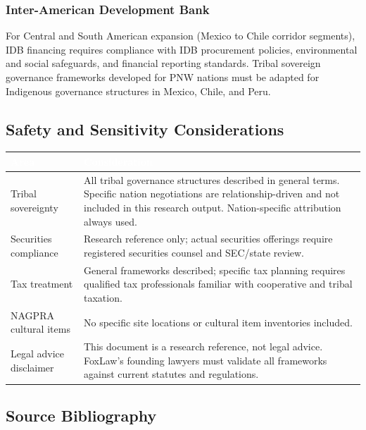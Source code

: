 \documentclass[11pt,letterpaper]{article}
\newcommand{\tableheader}[1]{\textbf{\sffamily\textcolor{white}{#1}}}
\begin{document}
\subsubsection{Inter-American Development Bank}

For Central and South American expansion (Mexico to Chile corridor segments), IDB financing requires compliance with IDB procurement policies, environmental and social safeguards, and financial reporting standards. Tribal sovereign governance frameworks developed for PNW nations must be adapted for Indigenous governance structures in Mexico, Chile, and Peru.

\subsection{Safety and Sensitivity Considerations}

\begin{center}
\begin{tabularx}{\textwidth}{L{4cm}X}
\toprule
{}
\tableheader{Area} & \tableheader{Consideration} \\
\midrule
Tribal sovereignty & All tribal governance structures described in general terms. Specific nation negotiations are relationship-driven and not included in this research output. Nation-specific attribution always used. \\
Securities compliance & Research reference only; actual securities offerings require registered securities counsel and SEC/state review. \\
Tax treatment & General frameworks described; specific tax planning requires qualified tax professionals familiar with cooperative and tribal taxation. \\
NAGPRA cultural items & No specific site locations or cultural item inventories included. \\
Legal advice disclaimer & This document is a research reference, not legal advice. FoxLaw's founding lawyers must validate all frameworks against current statutes and regulations. \\
\bottomrule
\end{tabularx}
\end{center}

\subsection{Source Bibliography}
\end{document}
